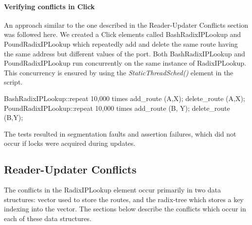 \documentclass{article}
\begin{document}
\paragraph{Verifying conflicts in Click}
An approach similar to the one described in the Reader-Updater Conflicts section was followed here. We created a Click elements called BashRadixIPLookup and PoundRadixIPLookup which repeatedly add and delete the same route having the same address but different values of the port. Both BashRadixIPLookup and PoundRadixIPLookup run concurrently on the same instance of RadixIPLookup. This concurrency is ensured by using the \emph{StaticThreadSched()} element in the script.
\begin{code}
  BashRadixIPLookup::repeat 10,000 times {
    add_route (A,X);
    delete_route (A,X);
  }
  PoundRadixIPLookup::repeat 10,000 times {
    add_route (B, Y);
    delete_route (B,Y);
  } 
\end{code}
The tests resulted in segmentation faults and assertion failures, which did not occur if locks were acquired during updates.
\subsection{Reader-Updater Conflicts}
The conflicts in the RadixIPLookup element occur primarily in two data structures: vector used to store the routes, and the radix-tree which stores a key indexing into the vector. The sections below describe the conflicts which occur in each of these data structures.
\end{document}
